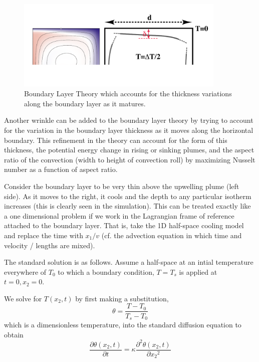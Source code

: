 \documentclass[10pt]{article}
\begin{document}
		\begin{figure}[h]
			\begin{center}
				\includegraphics[width=100mm]{Diagrams/blt2}
				\caption[]{Boundary Layer Theory which accounts for the thickness variations along the 
					boundary layer as it matures.}
			\end{center}	
		\end{figure}
	
	Another wrinkle can be added to the boundary layer theory by trying to account for
	the variation  in the boundary layer thickness as it moves along the horizontal boundary.
	This refinement in the theory can account for the form of this thickness, the potential energy
	change in rising or sinking plumes, and the aspect ratio of the convection (width to height of
	convection roll) by maximizing Nusselt number as a function of aspect ratio.
	
	Consider the boundary layer to be very thin above the upwelling plume (left side). As it moves
	to the right, it cools and the depth to any particular isotherm increases (this is clearly
	seen in the simulation). This can be treated exactly like a one dimensional problem if we
	work in the Lagrangian frame of reference attached to the boundary layer. That is,
	take the 1D half-space cooling model and replace the time with $x_1/v$ (cf. the advection
	equation in which time and velocity / lengths are mixed).
	
	The standard solution is as follows. Assume a half-space at an intial
	temperature everywhere of $T_0$ to which a boundary condition, $T=T_s$ is applied
	at $t=0,x_2=0$. 
	
	 
	We solve for $T(x_2,t)$ by first making a substitution, 
			\begin{equation}	
			\theta = \frac{T-T_0}{T_s-T_0} 	
		\end{equation}
	which is a dimensionless temperature, into the standard diffusion equation to obtain	
		\begin{equation}
			\frac{\partial \theta(x_2,t)}{\partial t} = \kappa \frac{\partial ^2 \theta(x_2,t)}{\partial {x_2}^2}
			\label{eq:difftheta}
		\end{equation}	
	
\end{document}
